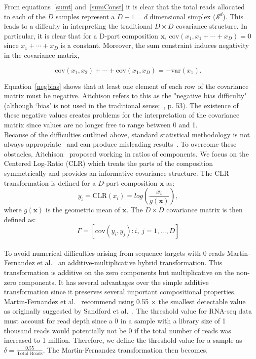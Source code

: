 \documentclass{article}\usepackage[]{graphicx}\usepackage[]{color}
\theoremstyle{definition}
\begin{document}
From equations~\ref{sumt} and~\ref{sumConst} it is clear that the total reads allocated to each of the $D$ samples represent a $D - 1 = d$ dimensional simplex ($\mathcal{S}^d$). This leads to a diffculty in interpreting the traditional $D \times D$ covariance structure.  In particular, it is clear that for a D-part composition $\mathbf{x}$, $\text{cov}(x_1, x_1+ \cdots +x_D) = 0$  since $x_1 + \cdots + x_D$ is a constant.  Moreover, the sum constraint induces negativity in the covariance matrix,

\begin{equation}
\text{cov}(x_1, x_2) + \cdots + \text{cov}(x_1, x_D) = -\text{var}(x_1).
\label{negbias}
\end{equation}

Equation~\ref{negbias} shows that at least one element of each row of the covariance matrix must be negative. Aitchison refers to this as the "negative bias difficulty" (although `bias' is not used in the traditional sense;~\cite{Aitchison1986}, p. 53). The existence of these negative values creates problems for the interpretation of the covariance matrix since values are no longer free to range between 0 and 1.\\


Because of the difficulties outlined above, standard statistical methodology is not always appropriate~\cite{Aitchison1986} and can produce misleading results~\cite{Lovell2015}.  To overcome these obstacles, Aitchison~\cite{Aitchison1980} proposed working in ratios of components. We focus on the Centered Log-Ratio (CLR) which treats the parts of the composition symmetrically and provides an informative covariance structure.  The CLR transformation is defined for a $D$-part composition $\mathbf{x}$ as:
\begin{equation}
y_i  = \text{CLR}(x_i) = log \left(\frac{x_i}{g(\mathbf{x})} \right),
\label{clr}
\end{equation}
where $g(\mathbf{x})$ is the geometric mean of $\mathbf{x}$.  The $D \times D$ covariance matrix is then defined as:
\begin{equation}
\Gamma = \left[\text{cov}\left(y_i, y_j \right): i,\ j = 1, ..., D \right]
\label{gamma}
\end{equation}
\\

To avoid numerical difficulties arising from sequence targets with 0 reads Martin-Fernandez et al.~\cite{Martin-Fernandez2000} an additive-multiplicative hybrid transformation.  This transformation is additive on the zero components but multiplicative on the non-zero components.  It has several advantages over the simple additive transformation since it preserves several important compositional properties.  Martin-Fernandez et al.~\cite{Martin-Fernandez2000} recommend using 0.55 $\times$ the smallest detectable value as originally suggested by Sandford et al.~\cite{Kiers2000, Sanford1993}. The threshold value for RNA-seq data must account for read depth since a 0 in a sample with a library size of 1 thousand reads would potentially not be 0 if the total number of reads was increased to 1 million.  Therefore, we define the threshold value for a sample as $\delta = \frac{0.55}{\text{Total Reads}}$.  The Martin-Fernandez transformation then becomes,
\end{document}
